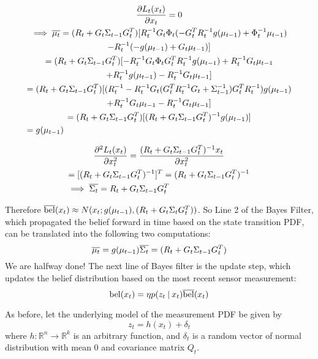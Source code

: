 \begin{multline*}
\frac{\partial L_t(x_t)}{\partial x_t} = 0 \\
\implies \overline{\mu_t} = (R_t + G_t\Sigma_{t-1}G_t^T) [R_t^{-1}G_t\Phi_t(-G_t^TR_t^{-1}g(\mu_{t-1}) + \Phi_t^{-1}\mu_{t-1}) \\ - R_t^{-1}(-g(\mu_{t-1}) + G_t\mu_{t-1})] \\
= (R_t + G_t\Sigma_{t-1}G_t^T) [-R_t^{-1}G_t\Phi_tG_t^TR_t^{-1}g(\mu_{t-1}) + R_t^{-1}G_t\mu_{t-1} \\ + R_t^{-1}g(\mu_{t-1}) - R_t^{-1}G_t\mu_{t-1}] \\
= (R_t + G_t\Sigma_{t-1}G_t^T) [(R_t^{-1} - R_t^{-1}G_t(G_t^TR_t^{-1}G_t + \Sigma_{t-1}^{-1})G_t^TR_t^{-1})g(\mu_{t-1}) \\
+ R_t^{-1}G_t\mu_{t-1} - R_t^{-1}G_t\mu_{t-1}] \\
= (R_t + G_t\Sigma_{t-1}G_t^T)[(R_t + G_t\Sigma_{t-1}G_t^T)^{-1} g(\mu_{t-1})] \\
= g(\mu_{t-1}) \hfill
\end{multline*}

\begin{multline*}
\frac{\partial^2 L_t(x_t) }{\partial x_t^2} = \frac{(R_t + G_t\Sigma_{t-1}G_t^T)^{-1}x_t}{\partial x_t^2} \\
= [(R_t + G_t\Sigma_{t-1}G_t^T)^{-1}]^T = (R_t + G_t\Sigma_{t-1}G_t^T)^{-1} \\
\implies \overline{\Sigma_t} = R_t + G_t\Sigma_{t-1}G_t^T \hfill
\end{multline*}

Therefore \(\overline{\mathrm{bel}}(x_t) \approx N(x_t;g(\mu_{t-1}),(R_t + G_t\Sigma_tG_t^T))\). So Line 2 of the Bayes Filter, which propagated the belief forward in time based on the state transition PDF, can be translated into the following two computations:
\[
\overline{\mu_t} = g(\mu_{t-1}) \\
\overline{\Sigma_t} = (R_t + G_t\Sigma_{t-1}G_t^T)
\]
We are halfway done! The next line of Bayes filter is the update step, which updates the belief distribution based on the most recent sensor measurement:
\[
\mathrm{bel}(x_t) = \eta p(z_t \mathbin{\vert} x_t) \overline{\mathrm{bel}}(x_t)
\]

As before, let the underlying model of the measurement PDF be given by \[z_t =  h(x_t) + \delta_t\] where \(h: \mathbb{R}^n \to \mathbb{R}^k\) is an arbitrary function, and \(\delta_t\) is a random vector of normal distribution with mean 0 and covariance matrix \(Q_t\).

